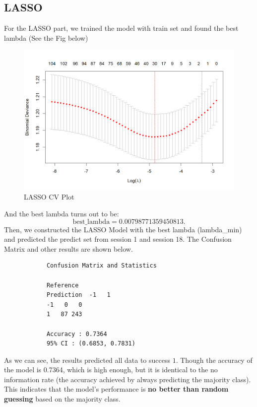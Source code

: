 \documentclass{article}
\begin{document}
	\subsection{LASSO}
	\par For the LASSO part, we trained the model with train set and found the best lambda (See the Fig below)
	\begin{figure}[htbp]
		\centering
		\includegraphics[scale = 0.5]{Pics/lasso_cv_plot}
		\caption{LASSO CV Plot}
		\label{fig:lassocvplot}
	\end{figure}
	\par And the best lambda turns out to be:
	$$\mbox{best\_lambda} = 0.00798771359450813.$$
	Then, we constructed the LASSO Model with the best lambda (lambda\_min) and predicted the predict set from session 1 and session 18. The Confusion Matrix and other results are shown below.
	\begin{framed}
		\begin{verbatim}
			Confusion Matrix and Statistics
			
			Reference
			Prediction  -1   1
			-1   0   0
			1   87 243
			
			Accuracy : 0.7364          
			95% CI : (0.6853, 0.7831)   
		\end{verbatim}
	\end{framed}
	\par As we can see, the results predicted all data to success $1$. Though the accuracy of the model is 0.7364, which is high enough, but it is identical to the no information rate (the accuracy achieved by always predicting the majority class). This indicates that the model's performance is \textbf{no better than random guessing} based on the majority class.
	\clearpage
\end{document}
